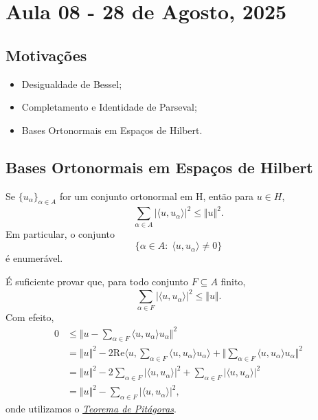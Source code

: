 \documentclass[../functional_analysis.tex]{subfiles}
\begin{document}
\section{Aula 08 - 28 de Agosto, 2025}
\subsection{Motivações}
\begin{itemize}
 \item Desigualdade de Bessel;
 \item Completamento e Identidade de Parseval; 
 \item Bases Ortonormais em Espaços de Hilbert.
\end{itemize}
\subsection{Bases Ortonormais em Espaços de Hilbert}
  \hypertarget{bessel_inequality}{
    \begin{theorem*}
     Se \(\{u_{\alpha }\}_{\alpha \in A}\) for um conjunto ortonormal em H, então para \(u\in H\), 
       \[
         \sum\limits_{\alpha \in A}^{}| \langle u, u_{\alpha } \rangle |^{2}\leq \Vert u \Vert^{2}.
       \]
       Em particular, o conjunto 
         \[
           \{\alpha \in A:\; \langle u, u_{\alpha } \rangle\neq 0\}
         \]
         é enumerável. 
   \end{theorem*}
  }
  \begin{proof*}
    É suficiente provar que, para todo conjunto \(F\subseteq A\) finito, 
      \[
        \sum\limits_{\alpha \in F}^{}| \langle u, u_{\alpha } \rangle |^{2} \leq \Vert u \Vert.
      \]
      Com efeito, 
     \begin{align*}
       0&\leq \biggl\Vert u-\sum\limits_{\alpha \in F}^{}\langle u, u_{\alpha } \rangle u_{\alpha } \biggr\Vert^{2}\\
        & = \Vert u \Vert^{2}-2 \mathrm{Re}\biggl\langle u, \sum\limits_{\alpha \in F}^{}\langle u, u_{\alpha } \rangle u_{\alpha } \biggr\rangle + \biggl\Vert \sum\limits_{\alpha \in F}^{}\langle u, u_{\alpha } \rangle u_{\alpha } \biggr\Vert^{2}\\ 
        &= \Vert u \Vert^{2}-2 \sum\limits_{\alpha \in F}^{}| \langle u, u_{\alpha } \rangle |^{2} + \sum\limits_{\alpha \in F}^{}| \langle u, u_{\alpha } \rangle |^{2}\\ 
        &= \Vert u \Vert^{2} - \sum\limits_{\alpha \in F}^{}| \langle u, u_{\alpha } \rangle |^{2},
     \end{align*}
     onde utilizamos o \hyperlink{pythagorean_theorem}{\textit{Teorema de Pitágoras}}. \qedsymbol
  \end{proof*}
\end{document}
